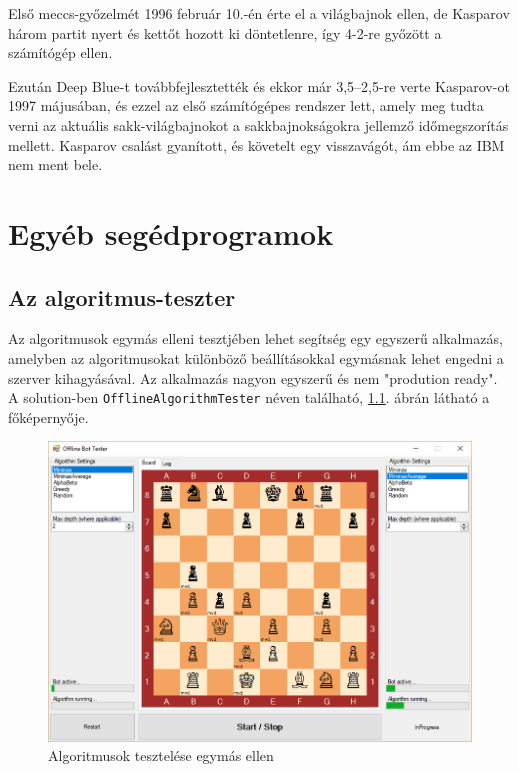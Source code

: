 \documentclass[twoside, a4paper, 12pt]{book}
\begin{document}
Első meccs-győzelmét 1996 február 10.-én érte el a világbajnok ellen, de Kasparov három partit nyert és kettőt hozott ki döntetlenre, így 4-2-re győzött a számítógép ellen.

Ezután Deep Blue-t továbbfejlesztették és ekkor már 3,5–2,5-re verte Kasparov-ot 1997 májusában, és ezzel az első számítógépes rendszer lett, amely meg tudta verni az aktuális sakk-világbajnokot a sakkbajnokságokra jellemző időmegszorítás mellett. Kasparov csalást gyanított, és követelt egy visszavágót, ám ebbe az IBM nem ment bele. \cite{DeepBlueHu}\cite{DeepBlueEn}

\chapter{Egyéb segédprogramok}\label{proofOfConcept}
\section{Az algoritmus-teszter}
Az algoritmusok egymás elleni tesztjében lehet segítség egy egyszerű alkalmazás, amelyben az algoritmusokat különböző beállításokkal egymásnak lehet engedni a szerver kihagyásával. Az alkalmazás nagyon egyszerű és nem "prodution ready". A solution-ben \texttt{OfflineAlgorithmTester} néven található, \ref{fig:offlineAlgorithmTester}. ábrán látható a főképernyője.

\begin{figure}[htbp]
	\centering
	\includegraphics[width=1.0\textwidth]{img/offlineAlgorithmTester.png}
	\caption{Algoritmusok tesztelése egymás ellen}
	\label{fig:offlineAlgorithmTester}
\end{figure}
\end{document}
